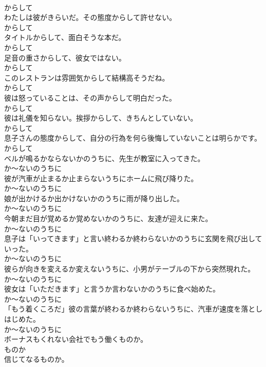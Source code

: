 \documentclass[8pt]{extreport}
\begin{document}
\begin{CJK}{UTF8}{min}
\\	からして
\\	わたしは彼がきらいだ。その態度からして許せない。	
\\	からして
\\	タイトルからして、面白そうな本だ。	
\\	からして
\\	足音の重さからして、彼女ではない。	
\\	からして
\\	このレストランは雰囲気からして結構高そうだね。	
\\	からして
\\	彼は怒っていることは、その声からして明白だった。	
\\	からして
\\	彼は礼儀を知らない。挨拶からして、きちんとしていない。	
\\	からして
\\	息子さんの態度からして、自分の行為を何ら後悔していないことは明らかです。	
\\	からして
\\	ベルが鳴るかならないかのうちに、先生が教室に入ってきた。	
\\	か～ないのうちに
\\	彼が汽車が止まるか止まらないうちにホームに飛び降りた。	
\\	か～ないのうちに
\\	娘が出かけるか出かけないかのうちに雨が降り出した。	
\\	か～ないのうちに
\\	今朝まだ目が覚めるか覚めないかのうちに、友達が迎えに来た。	
\\	か～ないのうちに
\\	息子は「いってきます」と言い終わるか終わらないかのうちに玄関を飛び出していった。	
\\	か～ないのうちに
\\	彼らが向きを変えるか変えないうちに、小男がテーブルの下から突然現れた。	
\\	か～ないのうちに
\\	彼女は「いただきます」と言うか言わないかのうちに食べ始めた。	
\\	か～ないのうちに
\\	「もう着くころだ」彼の言葉が終わるか終わらないうちに、汽車が速度を落としはじめた。	
\\	か～ないのうちに
\\	ボーナスもくれない会社でもう働くものか。	
\\	ものか
\\	信じてなるものか。	

\end{CJK}
\end{document}
